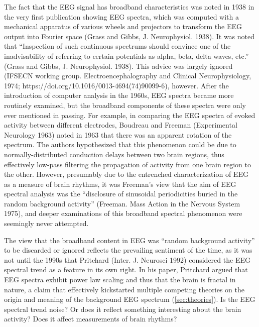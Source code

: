The fact that the EEG signal has broadband characteristics was noted in 1938 in the very first publication showing EEG spectra, which was computed with a mechanical apparatus of various wheels and projectors to transform the EEG output into Fourier space  (Grass and Gibbs, J. Neurophysiol. 1938). It was noted that ``Inspection of such continuous spectrums should convince one of the inadvisability of referring to certain potentials as alpha, beta, delta waves, etc.''  (Grass and Gibbs, J. Neurophysiol. 1938). This advice was largely ignored (IFSECN working group. Electroencephalography and Clinical Neurophysiology, 1974; https://doi.org/10.1016/0013-4694(74)90099-6), however. After the introduction of computer analysis in the 1960s, EEG spectra became more routinely examined, but the broadband components of these spectra were only ever mentioned in passing. For example, in comparing the EEG spectra of evoked activity between different electrodes, Boudreau and Freeman (Experimental Neurology 1963) noted in 1963 that there was an apparent rotation of the spectrum. The authors hypothesized that this phenomenon could be due to normally-distributed conduction delays between two brain regions, thus effectively low-pass filtering the propagation of activity from one brain region to the other. However, presumably due to the entrenched characterization of EEG as a measure of brain rhythms, it was Freeman’s view that the aim of EEG spectral analysis was the ``disclosure of sinusoidal periodicities buried in the random background activity'' (Freeman. Mass Action in the Nervous System 1975), and deeper examinations of this broadband spectral phenomenon were seemingly never attempted. 

The view that the broadband content in EEG was ``random background activity'' to be discarded or ignored reflects the prevailing sentiment of the time, as it was not until the 1990s that Pritchard (Inter. J. Neurosci 1992) considered the EEG spectral trend as a feature in its own right. In his paper, Pritchard argued that EEG spectra exhibit power law scaling and thus that the brain is fractal in nature, a claim that effectively kickstarted multiple competing theories on the origin and meaning of the background EEG spectrum (\autoref{sec:theories}). Is the EEG spectral trend noise? Or does it reflect something interesting about the brain activity? Does it affect measurements of brain rhythms? 

